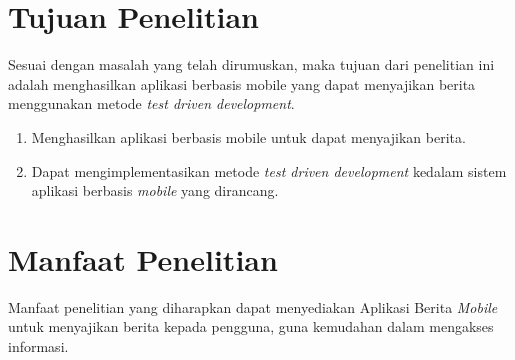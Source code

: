 \begin{spacing}{2}
\section{Tujuan Penelitian}
Sesuai dengan masalah yang telah dirumuskan, maka tujuan dari penelitian ini adalah menghasilkan aplikasi berbasis mobile yang dapat menyajikan berita menggunakan metode \emph{test driven development}.
\begin{enumerate}
  \item Menghasilkan aplikasi berbasis mobile untuk dapat menyajikan berita.
  \item Dapat mengimplementasikan metode \emph{test driven development} kedalam sistem aplikasi berbasis \emph{mobile} yang dirancang.
\end{enumerate}


\section{Manfaat Penelitian}
Manfaat penelitian yang diharapkan dapat menyediakan Aplikasi Berita \emph{Mobile} untuk menyajikan berita kepada pengguna, guna kemudahan dalam mengakses informasi.

\end{spacing}
\begin{comment}

\end{comment}
